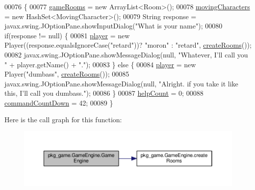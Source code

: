 \begin{DoxyCode}
00076                         \{
00077         \hyperlink{classpkg__game_1_1GameEngine_a4b4afca13ceeb1057e50471670bf3306}{gameRooms} = \textcolor{keyword}{new} ArrayList<Room>();
00078         \hyperlink{classpkg__game_1_1GameEngine_a64a7051b0ae6fb816d566be8ddbab3cb}{movingCharacters} = \textcolor{keyword}{new} HashSet<MovingCharacter>();
00079         String response = javax.swing.JOptionPane.showInputDialog(\textcolor{stringliteral}{"What is your name"});
00080         \textcolor{keywordflow}{if}(response != null) \{
00081             \hyperlink{classpkg__game_1_1GameEngine_a864d14b3375ad026e700ba0c0b9f9d2d}{player} = \textcolor{keyword}{new} Player((response.equalsIgnoreCase(\textcolor{stringliteral}{"retard"}))? \textcolor{stringliteral}{"moron"} : \textcolor{stringliteral}{"retard"}, 
      \hyperlink{classpkg__game_1_1GameEngine_a986180eff9d235e3b619c7403accfc31}{createRooms}());
00082             javax.swing.JOptionPane.showMessageDialog(null, \textcolor{stringliteral}{"Whatever, I'll call you "} + player.getName() +
       \textcolor{stringliteral}{"."});
00083         \} \textcolor{keywordflow}{else} \{
00084             \hyperlink{classpkg__game_1_1GameEngine_a864d14b3375ad026e700ba0c0b9f9d2d}{player} = \textcolor{keyword}{new} Player(\textcolor{stringliteral}{"dumbass"}, \hyperlink{classpkg__game_1_1GameEngine_a986180eff9d235e3b619c7403accfc31}{createRooms}());
00085             javax.swing.JOptionPane.showMessageDialog(null, \textcolor{stringliteral}{"Alright. if you take it like this, I'll call
       you dumbass."});
00086         \}
00087         \hyperlink{classpkg__game_1_1GameEngine_a3229e823376625b5d9102d24d628a0fb}{helpCount} = 0;
00088         \hyperlink{classpkg__game_1_1GameEngine_af4ea44f51563b4e2c0a67fe918bf5e3c}{commandCountDown} = 42;
00089     \}
\end{DoxyCode}


Here is the call graph for this function\-:\nopagebreak
\begin{figure}[H]
\begin{center}
\leavevmode
\includegraphics[width=350pt]{classpkg__game_1_1GameEngine_a6b6494f73d268d0c394d819c8425f1d5_cgraph}
\end{center}
\end{figure}




